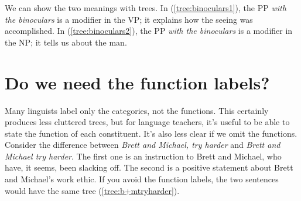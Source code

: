 We can show the two meanings with trees. In (\ref{tree:binoculars1}), the PP \textit{with the binoculars} is a modifier in the VP; it explains how the seeing was accomplished. In (\ref{tree:binoculars2}), the PP \textit{with the binoculars} is a modifier in the NP; it tells us about the man.

\ea
    \ea {} \label{tree:binoculars1}
    \ex {} \label{tree:binoculars2}
    \z
\z

\section{Do we need the function labels?}

Many linguists label only the categories, not the functions. This certainly produces less cluttered trees, but for language teachers, it's useful to be able to state the function of each constituent. It's also less clear if we omit the functions. Consider the difference between \textit{Brett and Michael, try harder} and \textit{Brett and Michael try harder}. The first one is an instruction to Brett and Michael, who have, it seems, been slacking off. The second is a positive statement about Brett and Michael's work ethic. If you avoid the function labels, the two sentences would have the same tree (\ref{tree:b+mtryharder}).

